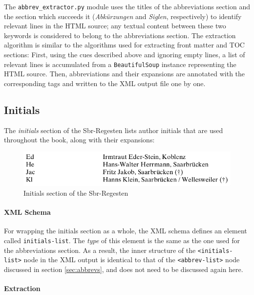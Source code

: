 The \texttt{abbrev\_extractor.py} module uses the titles of the
abbreviations section and the section which succeeds it
(\emph{Abkürzungen} and \emph{Siglen}, respectively) to identify
relevant lines in the HTML source; any textual content between these
two keywords is considered to belong to the abbreviations section. The
extraction algorithm is similar to the algorithms used for extracting
front matter and TOC sections: First, using the cues described above
and ignoring empty lines, a list of relevant lines is accumulated from
a \texttt{BeautifulSoup} instance representing the HTML source. Then,
abbreviations and their expansions are annotated with the
corresponding tags and written to the XML output file one by one.

\subsection{Initials}
\label{sec:initials}

The \emph{initials} section of the Sbr-Regesten lists author initials
that are used throughout the book, along with their expansions:

\begin{figure}[h]
  \centering
  \includegraphics[scale=0.4]{img/initials}
  \caption{Initials section of the Sbr-Regesten}
  \label{fig:initials}
\end{figure}

\paragraph{XML Schema}

For wrapping the initials section as a whole, the XML schema defines
an element called \texttt{initials-list}. The \emph{type} of this
element is the same as the one used for the abbreviations section. As
a result, the inner structure of the \texttt{<initials-list>} node in
the XML output is identical to that of the \texttt{<abbrev-list>} node
discussed in section \ref{sec:abbrevs}, and does not need to be
discussed again here.

\paragraph{Extraction}

